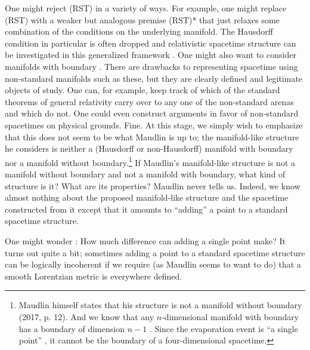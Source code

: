 \documentclass[authoryear,12pt,3p]{jowarticle}
\begin{document}
One might reject (RST) in a variety of ways. For example, one might replace (RST) with a weaker but analogous premise (RST)* that just relaxes some combination of the conditions on the underlying manifold.  The Hausdorff condition in particular is often dropped and relativistic spacetime structure can be investigated in this generalized framework \citep{Hajicek1971,Hawking+Ellis, Earman2008}. One might also want to consider manifolds with boundary \citep{Geroch+Horowitz}. There are drawbacks to representing spacetime using non-standard manifolds such as these, but they are clearly defined and legitimate objects of study. One can, for example, keep track of which of the standard theorems of general relativity carry over to any one of the non-standard arenas and which do not. One could even construct arguments in favor of non-standard spacetimes on physical grounds. Fine. At this stage, we simply wish to emphasize that this does not seem to be what Maudlin is up to; the manifold-like structure he considers is neither a (Hausdorff or non-Hausdorff) manifold with boundary nor a manifold without boundary.\footnote{Maudlin himself states that his structure is not a manifold without boundary (2017, p. 12). And we know that any $n$-dimensional manifold with boundary has a boundary of dimension $n-1$ \citep[p. 12]{Hawking+Ellis}. Since the evaporation event is ``a single point'' \citep[p. 20]{Maudlin}, it cannot be the boundary of a four-dimensional spacetime.} If Maudlin's manifold-like structure is not a manifold without boundary and not a manifold with boundary, what kind of structure is it? What are its properties? Maudlin never tells us. Indeed, we know almost nothing about the proposed manifold-like structure and the spacetime constructed from it except that it amounts to ``adding'' a point to a standard spacetime structure.

One might wonder \citep[cf.][p. 20]{Maudlin}: How much difference can adding  a single point make? It turns out quite a bit; sometimes adding a point to a standard spacetime structure can be logically incoherent if we require (as Maudlin seems to want to do) that a smooth Lorentzian metric is everywhere defined.
\end{document}
